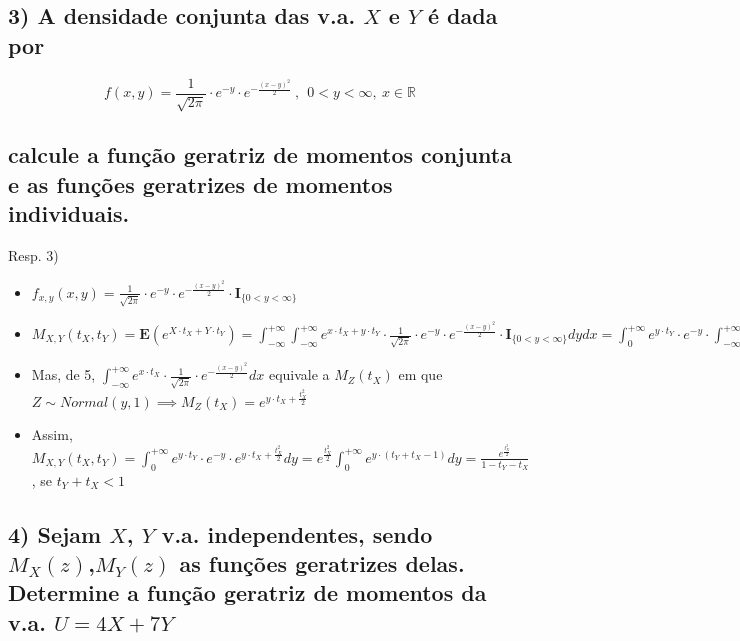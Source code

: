 \documentclass[portuguese]{article}
\begin{document}
\subsection*{\textcompwordmark{}}


\subsection*{\textmd{3) A densidade conjunta das v.a. $X$ e $Y$ é dada por}}

\[
f(x,y)=\frac{1}{\sqrt{2\pi}}\cdot e^{-y}\cdot e^{-\frac{(x-y)^{2}}{2}}\ ,\ \ 0<y<\infty,\ x\in\mathbb{R}
\]



\subsection*{\textmd{calcule a função geratriz de momentos conjunta e as funções
geratrizes de momentos individuais.}}

Resp. 3)
\begin{itemize}
\item $f_{x,y}(x,y)=\frac{1}{\sqrt{2\pi}}\cdot e^{-y}\cdot e^{-\frac{(x-y)^{2}}{2}}\cdot\mathbf{I}_{\{0<y<\infty\}}$
\item $M_{X,Y}(t_{X},t_{Y})=\mathbf{E}(e^{X\cdot t_{X}+Y\cdot t_{Y}})=\int_{-\infty}^{+\infty}\int_{-\infty}^{+\infty}e^{x\cdot t_{X}+y\cdot t_{Y}}\cdot\frac{1}{\sqrt{2\pi}}\cdot e^{-y}\cdot e^{-\frac{(x-y)^{2}}{2}}\cdot\mathbf{I}_{\{0<y<\infty\}}dydx=\int_{0}^{+\infty}e^{y\cdot t_{Y}}\cdot e^{-y}\cdot\int_{-\infty}^{+\infty}e^{x\cdot t_{X}}\cdot\frac{1}{\sqrt{2\pi}}\cdot e^{-\frac{(x-y)^{2}}{2}}dxdy$
\item Mas, de 5, $\int_{-\infty}^{+\infty}e^{x\cdot t_{X}}\cdot\frac{1}{\sqrt{2\pi}}\cdot e^{-\frac{(x-y)^{2}}{2}}dx$
equivale a $M_{Z}(t_{X})$ em que $Z\sim Normal(y,1)\implies M_{Z}(t_{X})=e^{y\cdot t_{X}+\frac{t_{X}^{2}}{2}}$
\item Assim, $M_{X,Y}(t_{X},t_{Y})=\int_{0}^{+\infty}e^{y\cdot t_{Y}}\cdot e^{-y}\cdot e^{y\cdot t_{X}+\frac{t_{X}^{2}}{2}}dy=e^{\frac{t_{X}^{2}}{2}}\int_{0}^{+\infty}e^{y\cdot(t_{Y}+t_{X}-1)}dy=\frac{e^{\frac{t_{X}^{2}}{2}}}{1-t_{Y}-t_{X}}$,
se $t_{Y}+t_{X}<1$
\end{itemize}

\subsection*{\textcompwordmark{}}


\subsection*{\textmd{4) Sejam $X$, $Y$ v.a. independentes, sendo $M_{X}(z)$,$M_{Y}(z)$
as funções geratrizes delas. Determine a função geratriz de momentos
da v.a. $U=4X+7Y$}}
\end{document}
